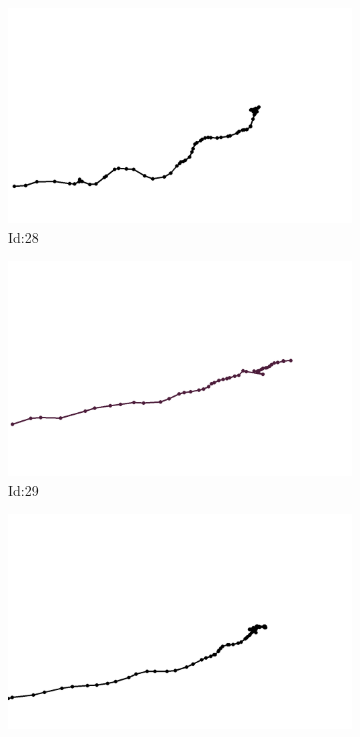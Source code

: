 \documentclass[12pt,twoside]{report}
\begin{document}
\begin{figure}
\centering
\begin{subfigure}[b]{0.20\textwidth}
\centering
\includegraphics[width=\textwidth]{../trajectories/28.png}
\caption{Id:28}
\end{subfigure}
\begin{subfigure}[b]{0.20\textwidth}
\centering
\includegraphics[width=\textwidth]{../trajectories/29.png}
\caption{Id:29}
\end{subfigure}
\begin{subfigure}[b]{0.20\textwidth}
\centering
\includegraphics[width=\textwidth]{../trajectories/49.png}

\end{subfigure}
\end{figure}
\end{document}
